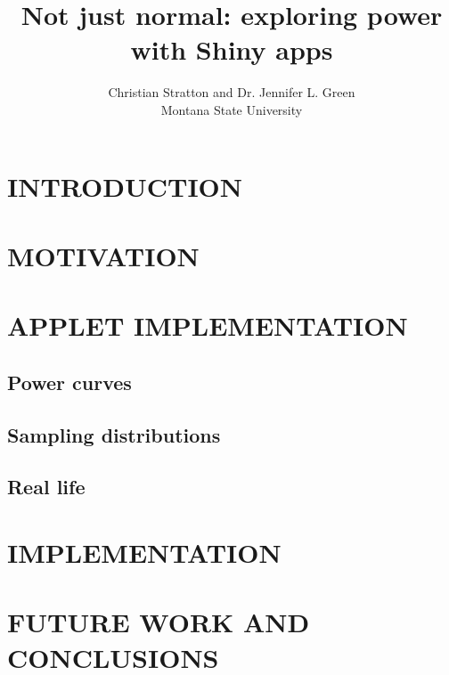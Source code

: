 \documentclass{TISE}
\title{Not just normal: exploring power with Shiny apps}
\author{Christian Stratton and Dr. Jennifer L. Green \\ Montana State University}
\begin{document}
	
\section{INTRODUCTION}

\section{MOTIVATION}

\section{APPLET IMPLEMENTATION}

\subsection{Power curves}

\subsection{Sampling distributions}

\subsection{Real life}

\section{IMPLEMENTATION}

\section{FUTURE WORK AND CONCLUSIONS}

\newpage

\end{document}

